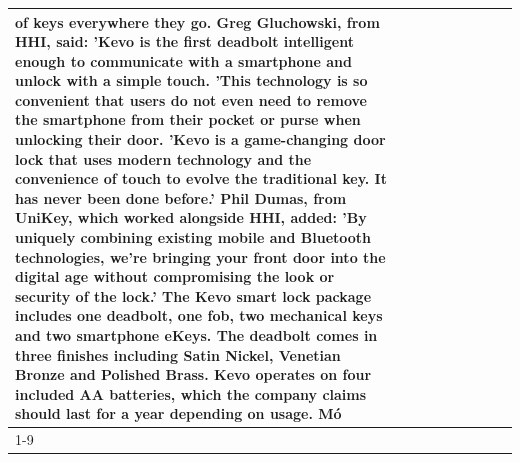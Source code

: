 \begin{table}[H]
\begin{tabular}{lllrlllll}
of keys everywhere they go. Greg Gluchowski, from HHI, said: 'Kevo is the first deadbolt intelligent enough to communicate with a smartphone and unlock with a simple touch. 'This technology is so convenient that users do not even need to remove the smartphone from their pocket or purse when unlocking their door. 'Kevo is a game-changing door lock that uses modern technology and the convenience of touch to evolve the traditional key. It has never been done before.' Phil Dumas, from UniKey, which worked alongside HHI, added: 'By uniquely combining existing mobile and Bluetooth technologies, we’re bringing your front door into the digital age without compromising the look or security of the lock.' The Kevo smart lock package includes one deadbolt, one fob, two mechanical keys and two smartphone eKeys. The deadbolt comes in three finishes including Satin Nickel, Venetian Bronze and Polished Brass. Kevo operates on four included AA batteries, which the company claims should last for a year depending on usage. Mó \\
\cline{1-9}

\end{tabular}
\end{table}
